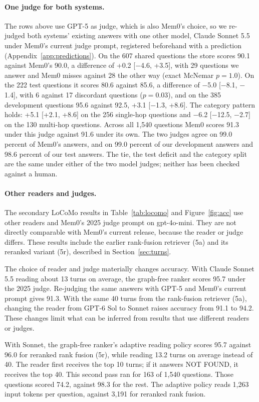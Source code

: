 \paragraph{One judge for both systems.} The rows above use GPT-5 as judge, which is also Mem0's choice, so we re-judged both systems' existing answers with one other model, Claude Sonnet 5.5 under Mem0's current judge prompt, registered beforehand with a prediction (Appendix~\ref{app:predictions}). On the 607 shared questions the store scores 90.1 against Mem0's 90.0, a difference of +0.2 [$-$4.6, +3.5], with 29 questions we answer and Mem0 misses against 28 the other way (exact McNemar $p = 1.0$). On the 222 test questions it scores 80.6 against 85.6, a difference of $-$5.0 [$-$8.1, $-$1.4], with 6 against 17 discordant questions ($p = 0.03$), and on the 385 development questions 95.6 against 92.5, +3.1 [$-$1.3, +8.6]. The category pattern holds: +5.1 [+2.1, +8.6] on the 256 single-hop questions and $-$6.2 [$-$12.5, $-$2.7] on the 130 multi-hop questions. Across all 1,540 questions Mem0 scores 91.3 under this judge against 91.6 under its own. The two judges agree on 99.0 percent of Mem0's answers, and on 99.0 percent of our development answers and 98.6 percent of our test answers. The tie, the test deficit and the category split are the same under either of the two model judges; neither has been checked against a human.

\paragraph{Other readers and judges.}
The secondary LoCoMo results in Table~\ref{tab:locomo} and Figure~\ref{fig:acc} use other readers and Mem0's 2025 judge prompt on gpt-4o-mini. They are not directly comparable with Mem0's current release, because the reader or judge differs. These results include the earlier rank-fusion retriever (5a) and its reranked variant (5r), described in Section~\ref{sec:turns}.

The choice of reader and judge materially changes accuracy. With Claude Sonnet 5.5 reading about 13 turns on average, the graph-free ranker scores 95.7 under the 2025 judge. Re-judging the same answers with GPT-5 and Mem0's current prompt gives 91.3. With the same 40 turns from the rank-fusion retriever (5a), changing the reader from GPT-6 Sol to Sonnet raises accuracy from 91.1 to 94.2. These changes limit what can be inferred from results that use different readers or judges.

With Sonnet, the graph-free ranker's adaptive reading policy scores 95.7 against 96.0 for reranked rank fusion (5r), while reading 13.2 turns on average instead of 40. The reader first receives the top 10 turns; if it answers NOT FOUND, it receives the top 40. This second pass ran for 163 of 1,540 questions. Those questions scored 74.2, against 98.3 for the rest. The adaptive policy reads 1,263 input tokens per question, against 3,191 for reranked rank fusion.

